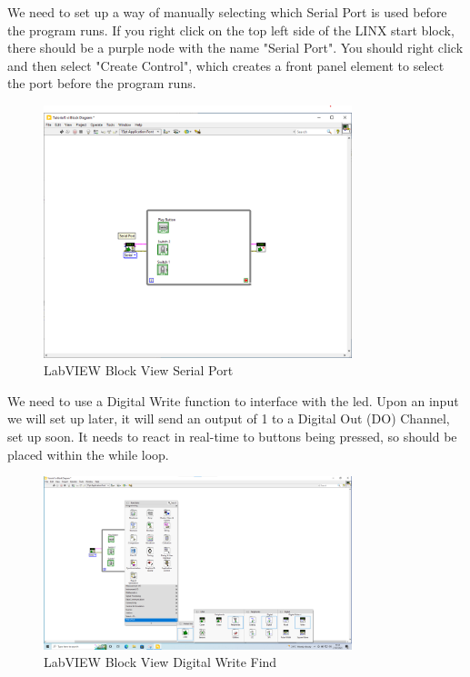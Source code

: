 \documentclass[a4paper,11pt]{report}
\begin{document}
We need to set up a way of manually selecting which Serial Port is used before the program runs. If you right click on the top left side of the LINX start block, there should be a purple node with the name "Serial Port". You should right click and then select "Create Control", which creates a front panel element to select the port before the program runs.

\begin{figure}[H]
\centering
\includegraphics[width=0.8\textwidth]{screenshots/labview18}
\caption{LabVIEW Block View Serial Port}
\end{figure}

We need to use a Digital Write function to interface with the \gls{led}. Upon an input we will set up later, it will send an output of 1 to a Digital Out (DO) Channel, set up soon. It needs to react in real-time to buttons being pressed, so should be placed within the while loop.

\begin{figure}[H]
\centering
\includegraphics[width=0.8\textwidth]{screenshots/labview17}
\caption{LabVIEW Block View Digital Write Find}
\end{figure}
\end{document}
